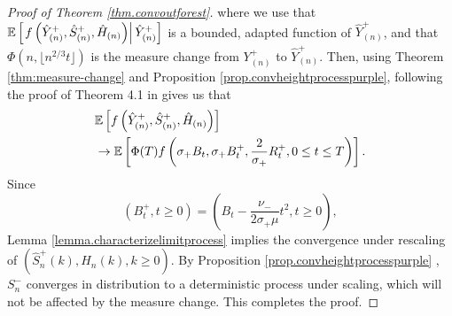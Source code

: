 \begin{proof}[Proof of Theorem \ref{thm.convoutforest}]
where we use that ${\mathbb E}\left[\left. f\left(\hat{Y}^+_{(n)},\hat{S}^+_{(n)},  \hat{H}_{(n)}\right)\right|\hat{Y}^+_{(n)}\right]$ is a bounded, adapted function of $\hat{Y}^+_{(n)}$, and that $\Phi(n,\lfloor n^{2/3} t\rfloor)$ is the measure change from ${Y}^+_{(n)}$ to $\hat{Y}^+_{(n)}$. Then, using Theorem \ref{thm:measure-change} and Proposition \ref{prop.convheightprocesspurple}, following the proof of Theorem 4.1 in \cite{conchon--kerjanStableGraphMetric2020} gives us that 
\begin{align*}
    &{\mathbb E}\left[f\left(\hat{Y}^+_{(n)},\hat{S}^+_{(n)},  \hat{H}_{(n)}\right) \right]\\
    &\to {\mathbb E}\left[\Phi(T)f\left(\sigma_+ B_t,\sigma_+ B^+_t,\frac{2}{\sigma_+}R^+_t,0\leq t \leq T\right)\right].
\end{align*}
Since $$(B^+_t,t\geq 0)=\left(B_t-\frac{\nu_-}{2\sigma_+ \mu}t^2,t\geq 0\right),$$
Lemma \ref{lemma.characterizelimitprocess} implies the convergence under rescaling of $(\hat{S}^+_n(k),\hat{H}_n(k),k\geq 0)$. By Proposition \ref{prop.convheightprocesspurple} , $S^{-}_n$ converges in distribution to a deterministic process under scaling, which will not be affected by the measure change. This completes the proof. 
\end{proof}

